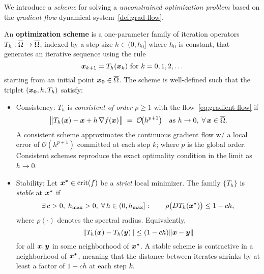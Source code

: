 \documentclass[10pt]{article}
\begin{document}
        We introduce a \emph{scheme} for solving a \emph{unconstrained optimization problem} 
        based on the \emph{gradient flow} dynamical system~\ref{def:grad-flow}.

        \begin{definition}
            An \textbf{optimization scheme} is a one-parameter family of iteration operators
            $T_h : \overline{\Omega} \rightarrow \overline{\Omega}$, indexed by a step size 
            $h \in (0, h_0]$ where $h_0$ is constant, that generates an iterative sequence using the rule
            \begin{equation}
                \label{eq:scheme}
                \bm{x}_{k+1} = T_h(\bm{x}_k) \text{ for } k = 0, 1, 2, \ldots
            \end{equation}
            starting from an initial point $\bm{x_0} \in \overline{\Omega}$. The scheme is well-defined such that the 
            triplet $(\bm{x_0}, h, T_h)$ satisfy:
            \begin{itemize}
                \item Consistency: $T_{h}$ is \emph{consistent of order $p\!\ge1$} with the flow~\eqref{eq:gradient-flow} if
                    $$
                        \bigl\|T_{h}(\bm{x})-\bm{x}+h\,\nabla f(\bm{x})\bigr\|
                        \;=\;\mathcal{O}\!\bigl(h^{p+1}\bigr)
                        \quad\text{as }h\to0,\;
                        \forall\,\bm{x}\in\overline{\Omega}.
                    $$
                    A consistent scheme approximates the continuous gradient flow w/ a local error of
                    $\mathcal{O}(h^{p+1})$ committed at each step $k$; where $p$ is the global order.
                    Consistent schemes reproduce the exact optimality condition in the limit as $h \to 0$.
                \item Stability: Let $\bm{x^*}\in\operatorname{crit}(f)$ be a \emph{strict} local minimizer.
                    The family $\{T_{h}\}$ is \emph{stable} at $\bm{x^*}$ if
                    $$
                        \exists\,c>0,\;h_{\max}>0,\;
                        \forall\,h\in(0,h_{\max}]:
                        \qquad
                        \rho\bigl(DT_{h}(\bm{x^*})\bigr)\le 1-ch,
                    $$
                    where $\rho(\cdot)$ denotes the spectral radius.  Equivalently,
                    $$
                        \|T_{h}(\bm{x})-T_{h}(\bm{y})\|\le(1-ch)\|\bm{x}-\bm{y}\|
                    $$
                    for all $\bm{x},\bm{y}$ in some neighborhood of $\bm{x^*}$.
                    A stable scheme is contractive in a neighborhood of $\bm{x^*}$, 
                    meaning that the distance between iterates shrinks by at least a 
                    factor of $1-ch$ at each step $k$.
            \end{itemize}
        \end{definition}
\end{document}
